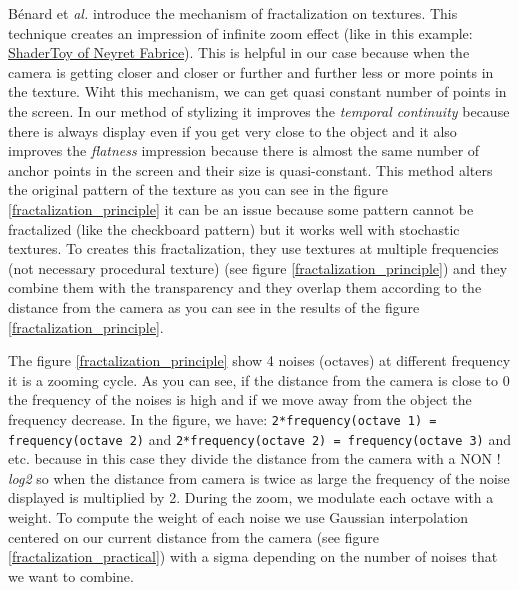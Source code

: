 Bénard et \textit{al.}\cite{benard_dynamic_2010} introduce the mechanism of fractalization on textures. This technique creates an impression of infinite zoom effect (like in this example: \href{https://www.shadertoy.com/view/XlBXWw?fbclid=IwAR1fU2JxQzXtks1ZcmVmzrHiv646G8w2gWceeiV-UToeFkAFMQ2NecbsGGs}{ShaderToy of Neyret Fabrice}). This is helpful in our case because when the camera is getting closer and closer or further and further less or more points in the texture. Wiht this mechanism, we can get quasi constant number of points in the screen. In our method of stylizing it improves the \textit{temporal continuity} because there is always display even if you get very close to the object and it also improves the \textit{flatness} impression because there is almost the same number of anchor points in the screen and their size is quasi-constant. This method alters the original pattern of the texture as you can see in the figure \ref{fractalization_principle} it can be an issue because some pattern cannot be fractalized (like the checkboard pattern) but it works well with stochastic textures. To creates this fractalization, they use textures at multiple frequencies (not necessary procedural texture) (see figure \ref{fractalization_principle}) and they combine them with the transparency and they overlap them according to the distance from the camera as you can see in the results of the figure \ref{fractalization_principle}. \newline


The figure \ref{fractalization_principle} show 4 noises (octaves) at different frequency it is a zooming cycle. As you can see, if the distance from the camera is close to 0 the frequency of the noises is high and if we move away from the object the frequency decrease. In the figure, we have: \texttt{2*frequency(octave 1) = frequency(octave 2)} and \texttt{2*frequency(octave 2) = frequency(octave 3)} and etc.  because in this case they divide the distance from the camera with a NON ! \textit{log2} so when the distance from camera is twice as large the frequency of the noise displayed is multiplied by 2. During the zoom, we modulate each octave with a weight. To compute the weight of each noise we use Gaussian interpolation centered on our current distance from the camera (see figure \ref{fractalization_practical}) with a sigma depending on the number of noises that we want to combine.







